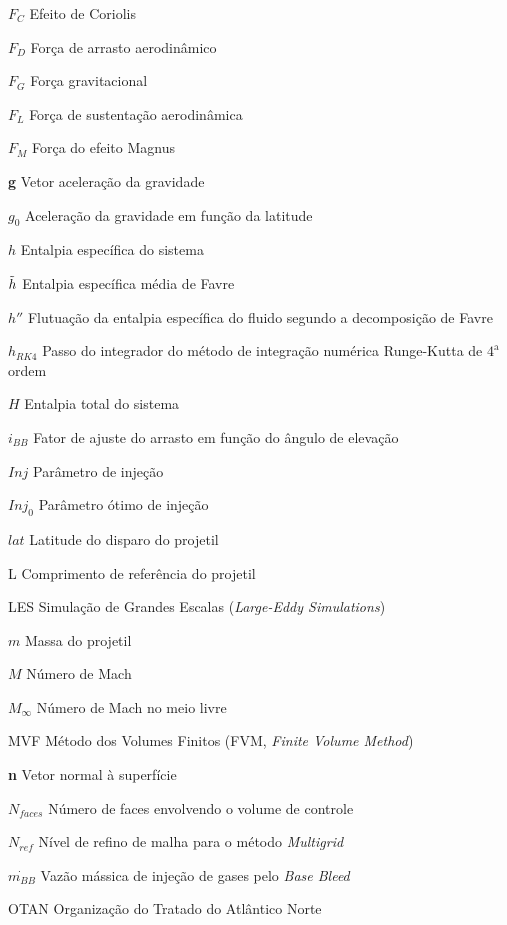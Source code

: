 \begin{siglas}
    \item[\(F_{C}\)] Efeito de Coriolis
    \item[\(F_{D}\)] Força de arrasto aerodinâmico
    \item[\(F_{G}\)] Força gravitacional
    \item[\(F_{L}\)] Força de sustentação aerodinâmica
    \item[\(F_{M}\)] Força do efeito Magnus
    \item[\textbf{g}] Vetor aceleração da gravidade
    \item[\(g_0\)] Aceleração da gravidade em função da latitude
    \item[\(h\)] Entalpia específica do sistema
    \item[\(\Tilde{h}\)] Entalpia específica média de Favre
    \item[\(h''\)] Flutuação da entalpia específica do fluido segundo a decomposição de Favre
    \item[\(h_{RK4}\)] Passo do integrador do método de integração numérica Runge-Kutta de $4^\text{a}$ ordem
    \item[\(H\)] Entalpia total do sistema
    \item[\(i_{BB}\)] Fator de ajuste do arrasto em função do ângulo de elevação
    \item[\(Inj\)] Parâmetro de injeção
    \item[\(Inj_0\)] Parâmetro ótimo de injeção
    \item[\(lat\)] Latitude do disparo do projetil
    \item[L] Comprimento de referência do projetil
    \item[LES] Simulação de Grandes Escalas (\textit{Large-Eddy Simulations})
    \item[\(m\)] Massa do projetil
    \item[\(M\)] Número de Mach
    \item[\(M_{\infty}\)] Número de Mach no meio livre
    \item[MVF] Método dos Volumes Finitos (FVM, \textit{Finite Volume Method})
    \item[\textbf{n}] Vetor normal à superfície
    \item[\(N_{faces}\)] Número de faces envolvendo o volume de controle
    \item[\(N_{ref}\)] Nível de refino de malha para o método \textit{Multigrid}
    \item[\(\Dot{m_{BB}}\)] Vazão mássica de injeção de gases pelo \textit{Base Bleed}
    \item[OTAN] Organização do Tratado do Atlântico Norte

\end{siglas}
